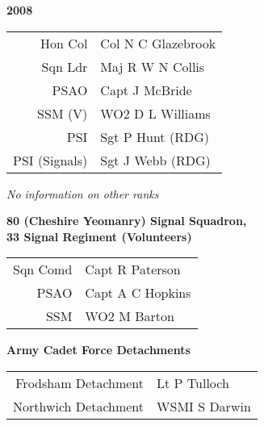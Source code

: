 \begin{center}
  \Huge
  \textbf{2008}
\end{center}

\begin{center}
  \small
  \begin{tabular}{rl}
    Hon Col & Col N C Glazebrook \\
    Sqn Ldr & Maj R W N Collis \\
    PSAO & Capt J McBride \\
    SSM (V) & WO2 D L Williams \\
    PSI & Sgt P Hunt (RDG) \\
    PSI (Signals) & Sgt J Webb (RDG) \\
  \end{tabular}
\end{center}

\begin{center}
  \textit{No information on other ranks}
\end{center}

\begin{center}
  \Large
  \textbf{80 (Cheshire Yeomanry) Signal Squadron, \\ 33 Signal Regiment (Volunteers)}
\end{center}

\begin{center}
  \small
  \begin{tabular}{rl}
    Sqn Comd & Capt R Paterson \\
    PSAO & Capt A C Hopkins \\
    SSM & WO2 M Barton \\
  \end{tabular}
\end{center}

\begin{center}
  \Large
  \textbf{Army Cadet Force Detachments}
\end{center}

\begin{center}
  \small
  \begin{tabular}{rl}
    Frodsham Detachment & Lt P Tulloch \\
    Northwich Detachment & WSMI S Darwin \\
  \end{tabular}
\end{center}

\vspace{50mm}

\pagebreak
